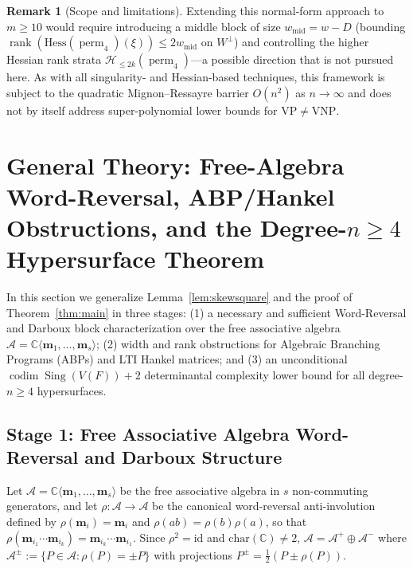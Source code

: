 \documentclass[11pt,a4paper]{article}
\theoremstyle{definition}
\newtheorem{remark}[theorem]{Remark}
\DeclareMathOperator{\perm}{perm}
\DeclareMathOperator{\codim}{codim}
\DeclareMathOperator{\Sing}{Sing}
\DeclareMathOperator{\rank}{rank}
\begin{document}
\begin{remark}[Scope and limitations]
Extending this normal-form approach to $m \ge 10$ would require introducing a middle block of size $w_{\mathrm{mid}} = w - D$ (bounding $\rank(\mathrm{Hess}(\perm_4)(\xi)) \le 2 w_{\mathrm{mid}}$ on $W^\perp$) and controlling the higher Hessian rank strata $\mathcal{H}_{\le 2k}(\perm_4)$---a possible direction that is not pursued here. As with all singularity- and Hessian-based techniques, this framework is subject to the quadratic Mignon--Ressayre barrier $O(n^2)$ as $n \to \infty$ and does not by itself address super-polynomial lower bounds for $\mathrm{VP} \neq \mathrm{VNP}$.
\end{remark}

\section{General Theory: Free-Algebra Word-Reversal, ABP/Hankel Obstructions, and the Degree-$n \ge 4$ Hypersurface Theorem}\label{sec:general}

In this section we generalize Lemma~\ref{lem:skewsquare} and the proof of Theorem~\ref{thm:main} in three stages: (1) a necessary and sufficient Word-Reversal and Darboux block characterization over the free associative algebra $\mathcal{A} = \mathbb{C}\langle \mathbf{m}_1,\dots,\mathbf{m}_s \rangle$; (2) width and rank obstructions for Algebraic Branching Programs (ABPs) and LTI Hankel matrices; and (3) an unconditional $\codim\Sing(V(F)) + 2$ determinantal complexity lower bound for all degree-$n \ge 4$ hypersurfaces.

\subsection{Stage 1: Free Associative Algebra Word-Reversal and Darboux Structure}

Let $\mathcal{A} = \mathbb{C}\langle \mathbf{m}_1,\dots,\mathbf{m}_s \rangle$ be the free associative algebra in $s$ non-commuting generators, and let $\rho : \mathcal{A} \to \mathcal{A}$ be the canonical word-reversal anti-involution defined by $\rho(\mathbf{m}_i) = \mathbf{m}_i$ and $\rho(ab) = \rho(b)\rho(a)$, so that $\rho(\mathbf{m}_{i_1}\cdots\mathbf{m}_{i_k}) = \mathbf{m}_{i_k}\cdots\mathbf{m}_{i_1}$. Since $\rho^2 = \mathrm{id}$ and $\mathrm{char}(\mathbb{C}) \neq 2$, $\mathcal{A} = \mathcal{A}^+ \oplus \mathcal{A}^-$ where $\mathcal{A}^\pm := \{P \in \mathcal{A} : \rho(P) = \pm P\}$ with projections $P^\pm = \frac{1}{2}(P \pm \rho(P))$.
\end{document}
